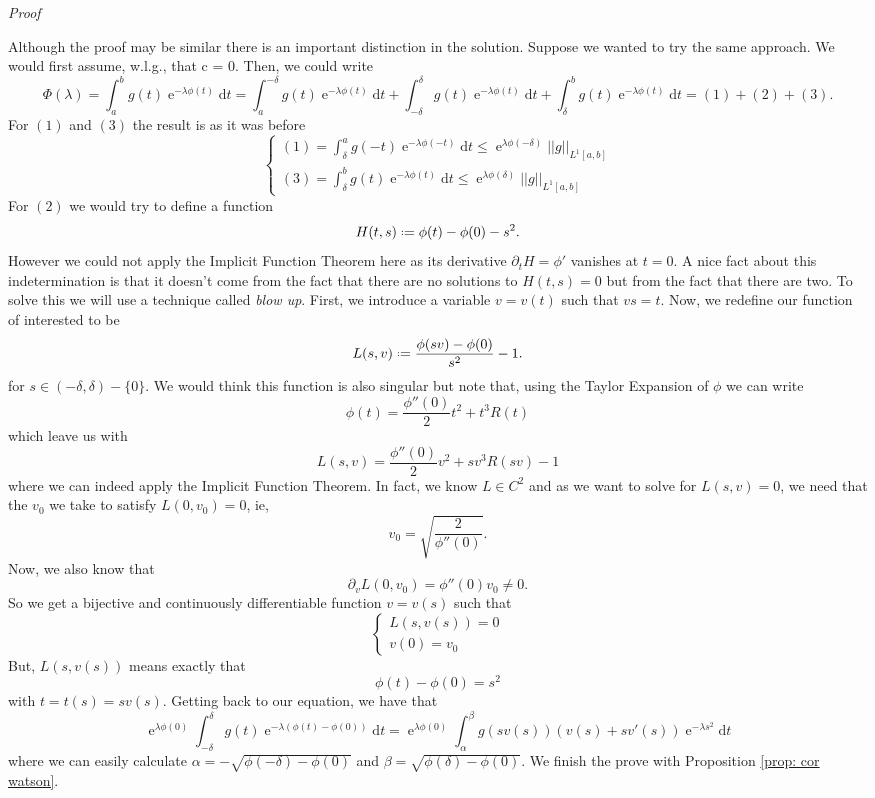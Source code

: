 \documentclass[]{report}
\makeatletter
\DeclareMathOperator{\ee}{e}
\newcommand*{\deff}{\mathrel{\vcenter{\baselineskip0.5ex \lineskiplimit0pt
			\hbox{\scriptsize.}\hbox{\scriptsize.}}}%
	=}
\newcommand{\dd}{\mathrm{d}}
\numberwithin{equation}{section} %
\newenvironment{Mproof}[1][Proof]{\par
	\pushQED{\qed}%
	\normalfont \topsep6\p@\@plus6\p@\relax
	\trivlist
	\item\relax
	{\itshape
		#1\@addpunct{.}}\hspace\labelsep\ignorespaces
}{%
	\popQED\endtrivlist\@endpefalse
}
\makeatother
\begin{document}
\begin{Mproof}
	Although the proof may be similar there is an important distinction in the solution. Suppose we wanted to try the same approach. We would first assume, w.l.g., that c = 0. Then, we could write
	$$ \Phi(\lambda) = \int_{a}^{b} g(t) \ee^{-\lambda \phi(t)} \dd t = \int_{a}^{-\delta} g(t) \ee^{-\lambda \phi(t)} \dd t + \int_{-\delta}^{\delta} g(t) \ee^{-\lambda \phi(t)} \dd t + \int_{\delta}^{b} g(t) \ee^{-\lambda \phi(t)} \dd t = (1) + (2) + (3).$$
	For $(1)$ and $(3)$ the result is as it was before
	\begin{equation*}
	\begin{cases}
		(1)	= \int_{\delta}^{a} g(-t) \ee^{-\lambda \phi(-t)} \dd t \leq \ee^{\lambda \phi(-\delta)} ||g||_{L^1[a,b]}\\
		(3) = \int_{\delta}^{b} g(t) \ee^{-\lambda \phi(t)} \dd t \leq \ee^{\lambda \phi(\delta)} ||g||_{L^1[a,b]}
	\end{cases}
	\end{equation*}
	For $(2)$ we would try to define a function 
	$$H(t,s) \deff \phi(t) - \phi(0) - s^2.$$
	However we could not apply the Implicit Function Theorem here as its derivative $\partial_t H = \phi'$ vanishes at $t=0$. A nice fact about this indetermination is that it doesn't come from the fact that there are no solutions to $H(t,s) = 0$ but from the fact that there are two. To solve this we will use a technique called \textit{blow up}. First, we introduce a variable $v = v(t)$ such that $vs = t$. Now, we redefine our function of interested to be
	$$L(s, v) \deff \frac{\phi(sv) - \phi(0)}{s^2} - 1.$$
	for $s\in(-\delta, \delta) - \{0\}$. We would think this function is also singular but note that, using the Taylor Expansion of $\phi$ we can write
	$$\phi(t) = \frac{\phi''(0)}{2}t^2 + t^3R(t) $$
	which leave us with 
	$$L(s, v) = \frac{\phi''(0)}{2}v^2 + sv^3R(sv) - 1 $$
	where we can indeed apply the Implicit Function Theorem. In fact, we know $L \in C^2$ and as we want to solve for $L(s,v) = 0$, we need that the $v_0$ we take to satisfy $L(0, v_0) = 0$, ie,
	$$v_0 = \sqrt{\frac{2}{\phi''(0)}}.$$
	Now, we also know that
	$$\partial_v L(0, v_0) = \phi''(0) v_0 \neq 0.$$
	So we get a bijective and continuously differentiable function $v = v(s)$ such that
	\begin{equation*}
	\begin{cases}
		L(s, v(s)) = 0 \\
		v(0) = v_0
	\end{cases}
	\end{equation*}
	But, $L(s, v(s))$ means exactly that
	$$\phi(t) - \phi(0) = s^2$$
	with $t = t(s) = sv(s)$. Getting back to our equation, we have that
	$$ \ee^{\lambda \phi(0)} \int_{-\delta}^{\delta} g(t) \ee^{-\lambda (\phi(t)-\phi(0))} \dd t = \ee^{\lambda \phi(0)} \int_{\alpha}^{\beta} g(sv(s)) (v(s) + sv'(s)) \ee^{-\lambda s^2} \dd t$$
	where we can easily calculate $\alpha = - \sqrt{\phi(-\delta) - \phi(0)}$ and $\beta = \sqrt{\phi(\delta) - \phi(0)}$. We finish the prove with Proposition \ref{prop: cor watson}.
\end{Mproof}
\end{document}
